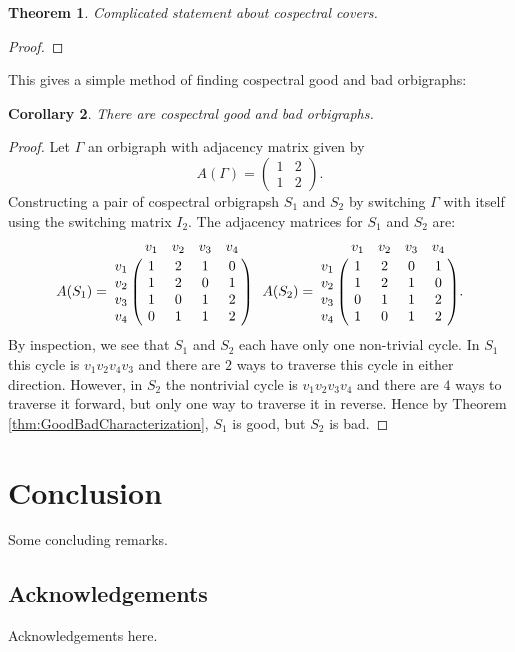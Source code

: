 \documentclass[12pt]{article}
\theoremstyle{plain}
\newtheorem{theorem}{Theorem}
\newtheorem{corollary}[theorem]{Corollary}
\theoremstyle{definition}
\theoremstyle{remark}
\begin{document}
  

  \begin{theorem}\label{thm:SeidelSwitchingExtension}
    Complicated statement about cospectral covers.
  \end{theorem}
  \begin{proof}
  \end{proof}

  This gives a simple method of finding cospectral good and bad orbigraphs:

  \begin{corollary}\label{coro:GoodBadCospectral}
    There are cospectral good and bad orbigraphs.
  \end{corollary}
  \begin{proof}
    Let $\Gamma$ an orbigraph with adjacency matrix given by
    $$
    A(\Gamma) = 
      \left( \begin{array}{cc}
        1 & 2 \\
        1 & 2
      \end{array} \right).
    $$
    Constructing a pair of cospectral orbigrapsh $S_1$ and $S_2$ by switching $\Gamma$ with itself using the switching matrix $I_2$. The adjacency matrices for $S_1$ and $S_2$ are:
    $$
    A(S_1) = 
      \bordermatrix {
            & v_1 & v_2 & v_3 & v_4 \cr
        v_1 & 1   & 2   & 1   & 0   \cr
        v_2 & 1   & 2   & 0   & 1   \cr
        v_3 & 1   & 0   & 1   & 2   \cr
        v_4 & 0   & 1   & 1   & 2
      } \ \ 
    A(S_2) = 
      \bordermatrix {
            & v_1 & v_2 & v_3 & v_4 \cr
        v_1 & 1   & 2   & 0   & 1   \cr
        v_2 & 1   & 2   & 1   & 0   \cr
        v_3 & 0   & 1   & 1   & 2   \cr
        v_4 & 1   & 0   & 1   & 2
      }.
    $$
    By inspection, we see that $S_1$ and $S_2$ each have only one non-trivial cycle. In $S_1$ this cycle is $v_1 v_2 v_4 v_3$ and there are $2$ ways to traverse this cycle in either direction. However, in $S_2$ the nontrivial cycle is $v_1 v_2 v_3 v_4$ and there are $4$ ways to traverse it forward, but only one way to traverse it in reverse. Hence by Theorem \ref{thm:GoodBadCharacterization}, $S_1$ is good, but $S_2$ is bad.
  \end{proof}


\section{Conclusion}
  Some concluding remarks.


\subsection*{Acknowledgements}
  Acknowledgements here.


%  
%  

\begin{thebibliography}{10}

\end{thebibliography}
\end{document}
